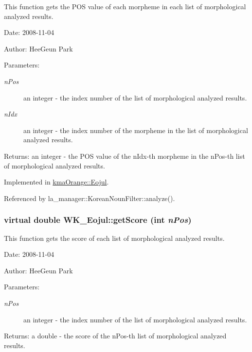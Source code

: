 This function gets the POS value of each morpheme in each list of morphological analyzed results. 

\begin{Desc}
\item[Date:]2008-11-04 \end{Desc}
\begin{Desc}
\item[Author:]HeeGeun Park \end{Desc}
\begin{Desc}
\item[Parameters:]
\begin{description}
\item[{\em nPos}]an integer - the index number of the list of morphological analyzed results. \item[{\em nIdx}]an integer - the index number of the morpheme in the list of morphological analyzed results. \end{description}
\end{Desc}
\begin{Desc}
\item[Returns:]an integer - the POS value of the nIdx-th morpheme in the nPos-th list of morphological analyzed results. \end{Desc}


Implemented in \hyperlink{classkmaOrange_1_1Eojul_d0bdce94d093e68e8fd455bdb660aa47}{kmaOrange::Eojul}.

Referenced by la\_\-manager::KoreanNounFilter::analyze().\hypertarget{classWK__Eojul_4b7079e12cf56a9f9211c3177096c018}{
\subsubsection[{getScore}]{\setlength{\rightskip}{0pt plus 5cm}virtual double WK\_\-Eojul::getScore (int {\em nPos})}}
\label{classWK__Eojul_4b7079e12cf56a9f9211c3177096c018}


This function gets the score of each list of morphological analyzed results. 

\begin{Desc}
\item[Date:]2008-11-04 \end{Desc}
\begin{Desc}
\item[Author:]HeeGeun Park \end{Desc}
\begin{Desc}
\item[Parameters:]
\begin{description}
\item[{\em nPos}]an integer - the index number of the list of morphological analyzed results. \end{description}
\end{Desc}
\begin{Desc}
\item[Returns:]a double - the score of the nPos-th list of morphological analyzed results. \end{Desc}


